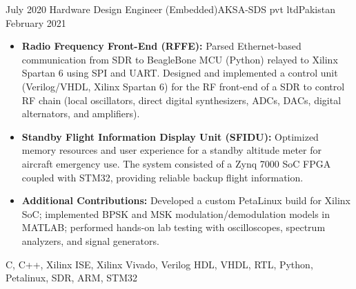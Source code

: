 \begin{experiences}
  \experience
  {July 2020}   {Hardware Design Engineer (Embedded)}{AKSA-SDS pvt ltd}{Pakistan}
  {February 2021} {
  \begin{itemize}
  \item \textbf{Radio Frequency Front-End (RFFE):}  Parsed Ethernet-based communication from SDR to BeagleBone MCU (Python) relayed to Xilinx Spartan 6 using SPI and UART. Designed and implemented a control unit (Verilog/VHDL, Xilinx Spartan 6) for the RF front-end of a SDR to control RF chain (local oscillators, direct digital synthesizers, ADCs, DACs, digital alternators, and amplifiers).
  \item \textbf{Standby Flight Information Display Unit (SFIDU):} Optimized memory resources and user experience for a standby altitude meter for aircraft emergency use. The system consisted of a Zynq 7000 SoC FPGA coupled with STM32, providing reliable backup flight information.
\item \textbf{Additional Contributions:} Developed a custom PetaLinux build for Xilinx SoC; implemented BPSK and MSK modulation/demodulation models in MATLAB; performed hands-on lab testing with oscilloscopes, spectrum analyzers, and signal generators.
  \end{itemize}
  }
  {C, C++, Xilinx ISE, Xilinx Vivado, Verilog HDL, VHDL, RTL, Python, Petalinux, SDR, ARM, STM32}
  \emptySeparator
  

\end{experiences}
